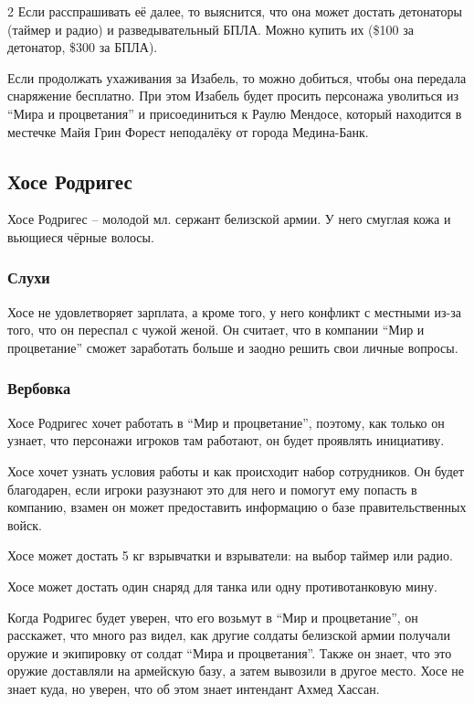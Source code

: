 \documentclass[twoside]{article}
\begin{document}
\begin{multicols}{2}
Если расспрашивать её далее, то выяснится, что она может достать
детонаторы (таймер и радио) и разведывательный БПЛА. Можно купить их
(\$100 за детонатор, \$300 за БПЛА).

Если продолжать ухаживания за Изабель, то можно добиться, чтобы она
передала снаряжение бесплатно. При этом Изабель будет просить персонажа
уволиться из \enquote{Мира и процветания} и присоединиться к Раулю Мендосе,
который находится в местечке Майя Грин Форест неподалёку от города
Медина-Банк.

\subsection{Хосе Родригес}\label{jose-rodriguez}

Хосе Родригес -- молодой мл. сержант белизской армии. У него смуглая
кожа и вьющиеся чёрные волосы.

\subsubsection{Слухи}\label{rumors-rodriguez}

Хосе не удовлетворяет зарплата, а кроме того, у него конфликт с местными
из-за того, что он переспал с чужой женой. Он считает, что в компании
\enquote{Мир и процветание} сможет заработать больше и заодно решить свои личные
вопросы.

\subsubsection{Вербовка}\label{recruitment-rodriguez}

Хосе Родригес хочет работать в \enquote{Мир и процветание}, поэтому, как только
он узнает, что персонажи игроков там работают, он будет проявлять
инициативу.

Хосе хочет узнать условия работы и как происходит набор сотрудников. Он
будет благодарен, если игроки разузнают это для него и помогут ему
попасть в компанию, взамен он может предоставить информацию о базе
правительственных войск.

Хосе может достать 5 кг взрывчатки и взрыватели: на выбор таймер или
радио.

Хосе может достать один снаряд для танка или одну противотанковую мину.

Когда Родригес будет уверен, что его возьмут в \enquote{Мир и процветание}, он
расскажет, что много раз видел, как другие солдаты белизской армии
получали оружие и экипировку от солдат \enquote{Мира и процветания}. Также он
знает, что это оружие доставляли на армейскую базу, а затем вывозили в
другое место. Хосе не знает куда, но уверен, что об этом знает интендант
Ахмед Хассан.


\end{multicols}
\end{document}
